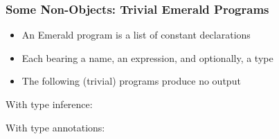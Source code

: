 \begin{frame}[fragile]

\frametitle{Some Non-Objects: Trivial Emerald Programs}

\begin{itemize}

\item An Emerald program is a list of constant declarations

\item Each bearing a name, an expression, and optionally, a type

\item The following (trivial) programs produce no output

\end{itemize}

With type inference:


With type annotations:


\end{frame}
